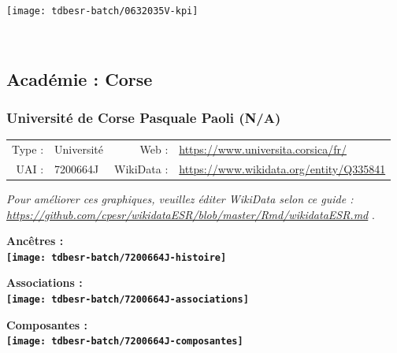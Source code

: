 \documentclass[12pt,french,]{article}
\begin{document}
\begin{center}\texttt{[image: tdbesr-batch/0632035V-kpi]} \end{center}\checkoddpage

\ifoddpage \fi ~\newpage  

\hypertarget{acaduxe9mie-corse}{%
\subsection{Académie : Corse}\label{acaduxe9mie-corse}}

\hypertarget{universituxe9-de-corse-pasquale-paoli-na}{%
\subsubsection{Université de Corse Pasquale Paoli
(N/A)}\label{universituxe9-de-corse-pasquale-paoli-na}}

\begin{tabular*}{\textwidth}{rp{5cm}rl}  
\hline  
Type : & Université & Web : &\href{https://www.universita.corsica/fr/}{https://www.universita.corsica/fr/} \\  
UAI : & 7200664J & WikiData : & \href{https://www.wikidata.org/entity/Q335841}{https://www.wikidata.org/entity/Q335841} \\  
\hline  
\end{tabular*}

\textit{\scriptsize Pour améliorer ces graphiques, veuillez éditer WikiData selon ce guide :  \href{https://github.com/cpesr/wikidataESR/blob/master/Rmd/wikidataESR.md}{https://github.com/cpesr/wikidataESR/blob/master/Rmd/wikidataESR.md}}
.

\vspace{1cm}  
\begin{minipage}[b]{0.50\textwidth}\begin{center} \bf Ancêtres : \\  
\texttt{[image: tdbesr-batch/7200664J-histoire]} \end{center}\end{minipage}\begin{minipage}[b]{0.50\textwidth}\begin{center} \bf Associations : \\  
\texttt{[image: tdbesr-batch/7200664J-associations]} \end{center}\end{minipage}

\hrulefill

\begin{center} \bf Composantes : \\  
\texttt{[image: tdbesr-batch/7200664J-composantes]} \end{center}
\end{document}
